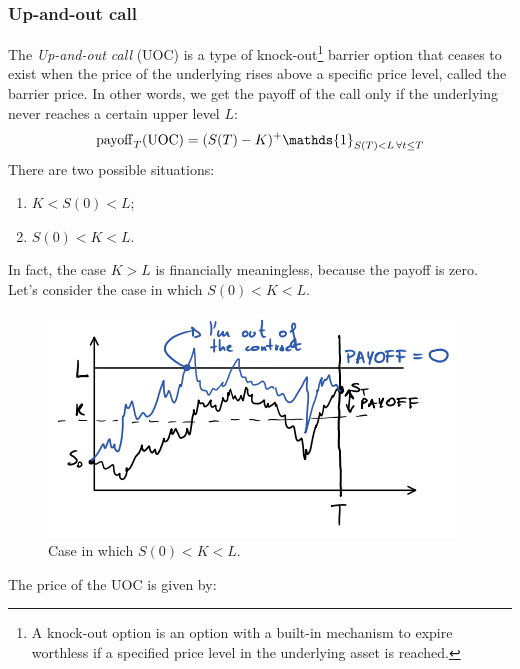 \subsubsection{Up-and-out call}
The \emph{Up-and-out call} (UOC) is a type of knock-out\footnote{A knock-out option is an option with a built-in mechanism to expire worthless if a specified price level in the underlying asset is reached.} barrier option that ceases to exist when the price of the underlying rises above a specific price level, called the barrier price. In other words, we get the payoff of the call only if the underlying never reaches a certain upper level $L$:
\begin{equation}
    \pay_T(\uoc) = (S(T)-K)^+\mathds{1}_{S(T)<L\,\forall t\le T}
\end{equation}
There are two possible situations:
\begin{enumerate}
    \item $K<S(0)<L$;
    \item $S(0)<K<L$.
\end{enumerate}
In fact, the case $K>L$ is financially meaningless, because the payoff is zero. \\
Let's consider the case in which $S(0)<K<L$.
\begin{figure}[h]
    \centering
    \includegraphics[scale=0.35]{fig/tmp/fig36.png}
    \caption{Case in which $S(0)<K<L$.}
    \label{fig:uoc}
\end{figure}
The price of the UOC is given by:
